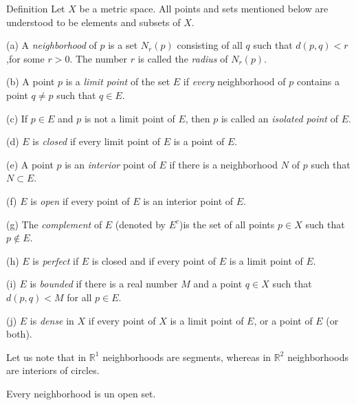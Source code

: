 \begin{myDef}\label{myDef:2.18 important}
    Definition Let $X$ be a metric space. All points and sets mentioned below are understood to be elements and subsets of $X$.

    (a) A \emph{neighborhood} of $p$ is a set $N_r(p)$ consisting of all $q$ such that $d(p, q) < r$,for some $r > 0$. The number $r$ is called the \emph{radius} of $N_r(p)$.

    (b) A point $p$ is a \emph{limit point} of the set $E$ if \emph{every} neighborhood of $p$ contains a point $q \neq p$ such that $q \in E$.
    
    (c) If $p \in E$ and $p$ is not a limit point of $E$, then $p$ is called an \emph{isolated point} of $E$.
    
    (d) $E$ is \emph{closed} if every limit point of $E$ is a point of $E$.
    
    (e) A point $p$ is an \emph{interior} point of $E$ if there is a neighborhood $N$ of $p$ such that $N \subset E$.
    
    (f) $E$ is \emph{open} if every point of $E$ is an interior point of $E$.
    
    (g) The \emph{complement} of $E$ (denoted by $E^c$)is the set of all points $p \in X$
    such that $p \not\in E$.
    
    (h) $E$ is \emph{perfect} if $E$ is closed and if every point of $E$ is a limit point
    of $E$.
    
    (i) $E$ is \emph{bounded} if there is a real number $M$ and a point $q \in X$ such that $d(p,q)< M$ for all $p \in E$.
    
    (j) $E$ is \emph{dense} in $X$ if every point of $X$ is a limit point of $E$, or a point of $E$ (or both).
\end{myDef}

Let us note that in $\mathbb{R}^1$ neighborhoods are segments, whereas in $\mathbb{R}^2$ neighborhoods are interiors of circles.


\begin{thm}\label{thm:2.19 neighbhood is open}
    Every neighborhood is un open set.
\end{thm}


